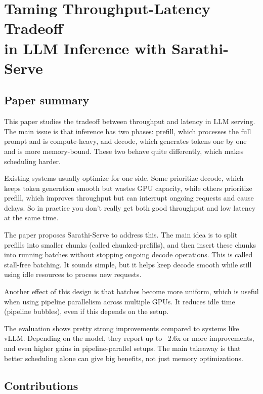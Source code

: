 \documentclass[a4paper, 12pt]{article}
\begin{document}
\section*{Taming Throughput-Latency Tradeoff\\in LLM Inference with Sarathi-Serve}
\subsection{Paper summary}

This paper studies the tradeoff between throughput and latency in LLM serving. The main issue is that inference has two phases: prefill, which processes the full prompt and is compute-heavy, and decode, which generates tokens one by one and is more memory-bound. These two behave quite differently, which makes scheduling harder.

Existing systems usually optimize for one side. Some prioritize decode, which keeps token generation smooth but wastes GPU capacity, while others prioritize prefill, which improves throughput but can interrupt ongoing requests and cause delays. So in practice you don’t really get both good throughput and low latency at the same time.

The paper proposes Sarathi-Serve to address this. The main idea is to split prefills into smaller chunks (called chunked-prefills), and then insert these chunks into running batches without stopping ongoing decode operations. This is called stall-free batching. It sounds simple, but it helps keep decode smooth while still using idle resources to process new requests.

Another effect of this design is that batches become more uniform, which is useful when using pipeline parallelism across multiple GPUs. It reduces idle time (pipeline bubbles), even if this depends on the setup.

The evaluation shows pretty strong improvements compared to systems like vLLM. Depending on the model, they report up to ~2.6x or more improvements, and even higher gains in pipeline-parallel setups. The main takeaway is that better scheduling alone can give big benefits, not just memory optimizations.

\subsection{Contributions}
\end{document}
